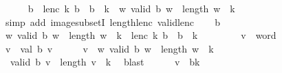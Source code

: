 \begin{isabellebody}
%
\isadelimproof
%
\endisadelimproof
%
\isatagproof
{}\isamarkupfalse%
\isanewline
\ \ \isamarkupfalse%
\ {\isachardoublequoteopen}{}\ {\isasymle}\ b\ {\isasymLongrightarrow}\ lenc\ k\ b\ {\isacharbackquote}{\kern0pt}\ {\isacharbraceleft}{\kern0pt}{\isachardot}{\kern0pt}{\isachardot}{\kern0pt}{\isacharless}{\kern0pt}b\ {\isacharcircum}{\kern0pt}\ k{\isacharbraceright}{\kern0pt}\ {\isasymsubseteq}\ {\isacharbraceleft}{\kern0pt}w{\isachardot}{\kern0pt}\ valid\ b\ w\ {\isasymand}\ length\ w\ {\isacharequal}{\kern0pt}\ k{\isacharbraceright}{\kern0pt}{\isachardoublequoteclose}\isanewline
\ \ \ \ \isamarkupfalse%
\ {\isacharparenleft}{\kern0pt}simp\ add{\isacharcolon}{\kern0pt}\ image{\isacharunderscore}{\kern0pt}subsetI\ length{\isacharunderscore}{\kern0pt}lenc\ valid{\isacharunderscore}{\kern0pt}lenc{\isacharparenright}{\kern0pt}\isanewline
{}\isamarkupfalse%
\isanewline
\ \ \isamarkupfalse%
\ {\isachardoublequoteopen}{}{\isasymle}b{\isachardoublequoteclose}\isanewline
\ \ \isamarkupfalse%
\ {\isachardoublequoteopen}{\isacharbraceleft}{\kern0pt}w{\isachardot}{\kern0pt}\ valid\ b\ w\ {\isasymand}\ length\ w\ {\isacharequal}{\kern0pt}\ k{\isacharbraceright}{\kern0pt}\ {\isasymsubseteq}\ lenc\ k\ b\ {\isacharbackquote}{\kern0pt}\ {\isacharbraceleft}{\kern0pt}{\isachardot}{\kern0pt}{\isachardot}{\kern0pt}{\isacharless}{\kern0pt}b\ {\isacharcircum}{\kern0pt}\ k{\isacharbraceright}{\kern0pt}{\isachardoublequoteclose}\isanewline
\ \ \isamarkupfalse%
\isanewline
\ \ \ \ \isamarkupfalse%
\ v\ {\isacharcolon}{\kern0pt}{\isacharcolon}{\kern0pt}\ word\isanewline
\ \ \ \ \isamarkupfalse%
\ {\isacharquery}{\kern0pt}v\ {\isacharequal}{\kern0pt}\ {\isachardoublequoteopen}val\ b\ v{\isachardoublequoteclose}\isanewline
\ \ \ \ \isamarkupfalse%
\ {\isachardoublequoteopen}v\ {\isasymin}\ {\isacharbraceleft}{\kern0pt}w{\isachardot}{\kern0pt}\ valid\ b\ w\ {\isasymand}\ length\ w\ {\isacharequal}{\kern0pt}\ k{\isacharbraceright}{\kern0pt}{\isachardoublequoteclose}\isanewline
\ \ \ \ \isamarkupfalse%
\ {}{\isacharcolon}{\kern0pt}\ {\isachardoublequoteopen}valid\ b\ v\ {\isasymand}\ length\ v\ {\isacharequal}{\kern0pt}\ k{\isachardoublequoteclose}\ \isamarkupfalse%
\ blast\isanewline
\ \ \ \ \isamarkupfalse%
\ {\isachardoublequoteopen}{\isacharquery}{\kern0pt}v\ {\isacharless}{\kern0pt}\ b{\isacharcircum}{\kern0pt}k{\isachardoublequoteclose}\ \isamarkupfalse%

\end{isabellebody}
